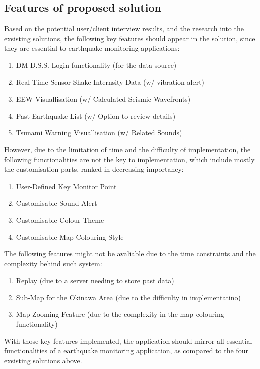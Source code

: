 \documentclass[10pt]{article}
\begin{document}
\subsection{Features of proposed solution}

Based on the potential user/client interview results, and the research into the exsisting solutions, the following key features should appear in the solution, since they are essential to earthquake monitoring applications:
\begin{enumerate}
    \item DM-D.S.S. Login functionality (for the data source)
    \item Real-Time Sensor Shake Internsity Data (w/ vibration alert)
    \item EEW Visuallisation (w/ Calculated Seismic Wavefronts)
    \item Past Earthquake List (w/ Option to review details)
    \item Tsunami Warning Visuallisation (w/ Related Sounds)
\end{enumerate}

However, due to the limitation of time and the difficulty of implementation, the following functionalities are not the key to implementation, which include mostly the customisation parts, ranked in decreasing importancy:
\begin{enumerate}
    \item User-Defined Key Monitor Point
    \item Customisable Sound Alert
    \item Customisable Colour Theme
    \item Customisable Map Colouring Style
\end{enumerate}

The following features might not be avaliable due to the time constraints and the complexity behind such system:
\begin{enumerate}
    \item Replay (due to a server needing to store past data)
    \item Sub-Map for the Okinawa Area (due to the difficulty in implementatino)
    \item Map Zooming Feature (due to the complexity in the map colouring functionality)
\end{enumerate}

With those key features implemented, the application should mirror all essential functionalities of a earthquake monitoring application, as compared to the four exsisting solutions above.
\end{document}
